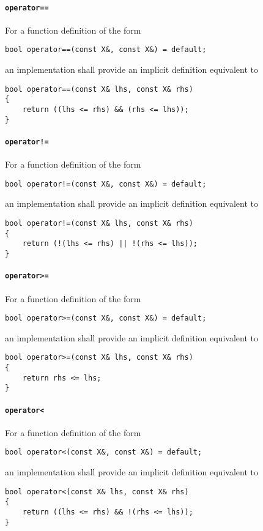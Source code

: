 ﻿\documentclass[a4paper,11pt,final]{article}
\begin{document}
\paragraph{\texttt{operator==}}
For a function definition of the form
\begin{verbatim}
bool operator==(const X&, const X&) = default;
\end{verbatim}
an implementation shall provide an implicit definition equivalent to
\begin{verbatim}
bool operator==(const X& lhs, const X& rhs)
{
    return ((lhs <= rhs) && (rhs <= lhs));
}
\end{verbatim}

\paragraph{\texttt{operator!=}}
For a function definition of the form
\begin{verbatim}
bool operator!=(const X&, const X&) = default;
\end{verbatim}
an implementation shall provide an implicit definition equivalent to
\begin{verbatim}
bool operator!=(const X& lhs, const X& rhs)
{
    return (!(lhs <= rhs) || !(rhs <= lhs));
}
\end{verbatim}

\paragraph{\texttt{operator>=}}
For a function definition of the form
\begin{verbatim}
bool operator>=(const X&, const X&) = default;
\end{verbatim}
an implementation shall provide an implicit definition equivalent to
\begin{verbatim}
bool operator>=(const X& lhs, const X& rhs)
{
    return rhs <= lhs;
}
\end{verbatim}

\paragraph{\texttt{operator<}}
For a function definition of the form
\begin{verbatim}
bool operator<(const X&, const X&) = default;
\end{verbatim}
an implementation shall provide an implicit definition equivalent to
\begin{verbatim}
bool operator<(const X& lhs, const X& rhs)
{
    return ((lhs <= rhs) && !(rhs <= lhs));
}
\end{verbatim}
\end{document}
